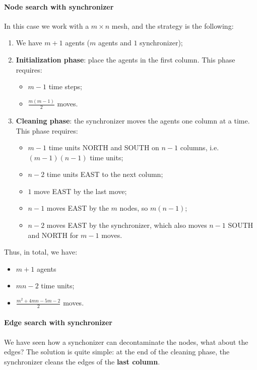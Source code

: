 \paragraph{Node search with synchronizer} In this case we work with a $m \times n$ mesh, and the strategy is the following:
\begin{enumerate}
    \item We have $m+1$ agents ($m$ agents and $1$ synchronizer);
    \item \textbf{Initialization phase}: place the agents in the first column.
    This phase requires:
    \begin{itemize}
        \item $m-1$ time steps;
        \item $\frac{m(m-1)}{2}$ moves.
    \end{itemize}
    \item \textbf{Cleaning phase}: the synchronizer moves the agents one column at a time.
    This phase requires:
    \begin{itemize}
        \item $m-1$ time units NORTH and SOUTH on $n-1$ columns, i.e. $(m-1)(n-1)$ time units;
        \item $n-2$ time units EAST to the next column;
        \item $1$ move EAST by the last move;
        \item $n-1$ moves EAST by the $m$ nodes, so $m(n-1)$;
        \item $n-2$ moves EAST by the synchronizer, which also moves $n-1$ SOUTH and NORTH for $m-1$ moves.
    \end{itemize}
\end{enumerate}

Thus, in total, we have:
\begin{itemize}
    \item $m+1$ agents
    \item $mn-2$ time units;
    \item $\frac{m^2 + 4mn - 5m - 2}{2}$ moves.
\end{itemize}


\paragraph{Edge search with synchronizer} We have seen how a synchonizer can decontaminate the nodes, what about the edges? The solution is quite simple: at the end of the cleaning phase, the synchronizer cleans the edges of the \textbf{last column}.

